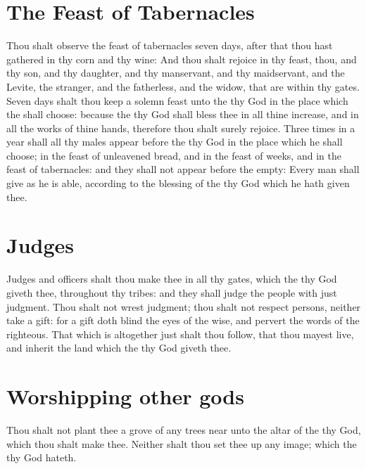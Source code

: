 \begin{biblechapter}
\section*{The Feast of Tabernacles}
\verse Thou shalt observe the feast of tabernacles seven days, after that thou hast gathered in thy corn and thy wine:
\verse And thou shalt rejoice in thy feast, thou, and thy son, and thy daughter, and thy manservant, and thy maidservant, and the Levite, the stranger, and the fatherless, and the widow, that are within thy gates.
\verse Seven days shalt thou keep a solemn feast unto the \LORD thy God in the place which the \LORD shall choose: because the \LORD thy God shall bless thee in all thine increase, and in all the works of thine hands, therefore thou shalt surely rejoice.
\verse Three times in a year shall all thy males appear before the \LORD thy God in the place which he shall choose; in the feast of unleavened bread, and in the feast of weeks, and in the feast of tabernacles: and they shall not appear before the \LORD empty:
\verse Every man shall give as he is able, according to the blessing of the \LORD thy God which he hath given thee.
\section*{Judges}
\verse Judges and officers shalt thou make thee in all thy gates, which the \LORD thy God giveth thee, throughout thy tribes: and they shall judge the people with just judgment.
\verse Thou shalt not wrest judgment; thou shalt not respect persons, neither take a gift: for a gift doth blind the eyes of the wise, and pervert the words of the righteous.
\verse That which is altogether just shalt thou follow, that thou mayest live, and inherit the land which the \LORD thy God giveth thee.
\section*{Worshipping other gods}
\verse Thou shalt not plant thee a grove of any trees near unto the altar of the \LORD thy God, which thou shalt make thee.
\verse Neither shalt thou set thee up any image; which the \LORD thy God hateth.
\end{biblechapter}

